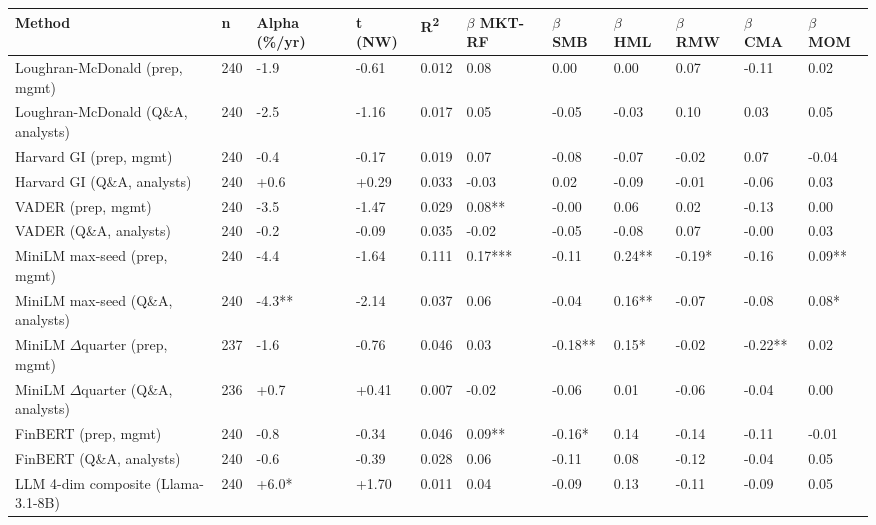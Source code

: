 \bigskip\noindent
\begin{tabular}{p{}p{}p{}p{}p{}p{}p{}p{}p{}p{}p{}}
\toprule
Method & n & Alpha (\%/yr) & t (NW) & R\textsuperscript{2} & $\beta$ MKT-RF & $\beta$ SMB & $\beta$ HML & $\beta$ RMW & $\beta$ CMA & $\beta$ MOM \\
\hline
Loughran-McDonald (prep, mgmt) & 240 & -1.9 & -0.61 & 0.012 & 0.08 & 0.00 & 0.00 & 0.07 & -0.11 & 0.02 \\
Loughran-McDonald (Q\&A, analysts) & 240 & -2.5 & -1.16 & 0.017 & 0.05 & -0.05 & -0.03 & 0.10 & 0.03 & 0.05 \\
Harvard GI (prep, mgmt) & 240 & -0.4 & -0.17 & 0.019 & 0.07 & -0.08 & -0.07 & -0.02 & 0.07 & -0.04 \\
Harvard GI (Q\&A, analysts) & 240 & +0.6 & +0.29 & 0.033 & -0.03 & 0.02 & -0.09 & -0.01 & -0.06 & 0.03 \\
VADER (prep, mgmt) & 240 & -3.5 & -1.47 & 0.029 & 0.08** & -0.00 & 0.06 & 0.02 & -0.13 & 0.00 \\
VADER (Q\&A, analysts) & 240 & -0.2 & -0.09 & 0.035 & -0.02 & -0.05 & -0.08 & 0.07 & -0.00 & 0.03 \\
MiniLM max-seed (prep, mgmt) & 240 & -4.4 & -1.64 & 0.111 & 0.17*** & -0.11 & 0.24** & -0.19* & -0.16 & 0.09** \\
MiniLM max-seed (Q\&A, analysts) & 240 & -4.3** & -2.14 & 0.037 & 0.06 & -0.04 & 0.16** & -0.07 & -0.08 & 0.08* \\
MiniLM $\Delta$quarter (prep, mgmt) & 237 & -1.6 & -0.76 & 0.046 & 0.03 & -0.18** & 0.15* & -0.02 & -0.22** & 0.02 \\
MiniLM $\Delta$quarter (Q\&A, analysts) & 236 & +0.7 & +0.41 & 0.007 & -0.02 & -0.06 & 0.01 & -0.06 & -0.04 & 0.00 \\
FinBERT (prep, mgmt) & 240 & -0.8 & -0.34 & 0.046 & 0.09** & -0.16* & 0.14 & -0.14 & -0.11 & -0.01 \\
FinBERT (Q\&A, analysts) & 240 & -0.6 & -0.39 & 0.028 & 0.06 & -0.11 & 0.08 & -0.12 & -0.04 & 0.05 \\
LLM 4-dim composite (Llama-3.1-8B) & 240 & +6.0* & +1.70 & 0.011 & 0.04 & -0.09 & 0.13 & -0.11 & -0.09 & 0.05 \\
\bottomrule
\end{tabular}

